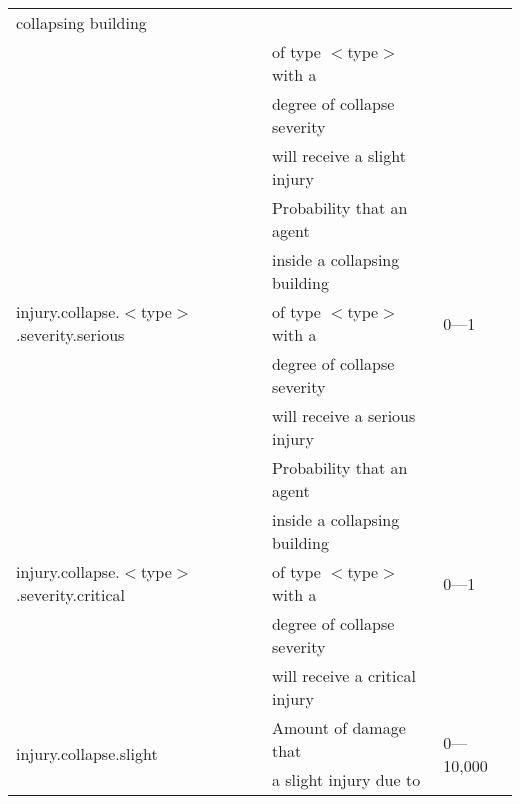 \documentclass{article}
\begin{document}
\begin{table}[htb]
\begin{tabular}{lll}
  collapsing building                   & \\
                                                                & of type
   $<$type$>$ with a                    & \\
                                                                & degree of
  collapse severity                     & \\
                                                                & will receive a
  slight injury                         & \\
  \hline
  \multirow{5}{*}{injury.collapse.$<$type$>$.severity.serious}  & Probability
  that an agent                         & \multirow{5}{*}{0---1}\\
                                                                & inside a
  collapsing building                   & \\
                                                                & of type
   $<$type$>$ with a                    & \\
                                                                & degree of
  collapse severity                     & \\
                                                                & will receive a
  serious injury                        & \\
  \hline
  \multirow{5}{*}{injury.collapse.$<$type$>$.severity.critical} & Probability
  that an agent                         & \multirow{5}{*}{0---1}\\
                                                                & inside a
  collapsing building                   & \\
                                                                & of type
  $<$type$>$ with a                     & \\
                                                                & degree of
  collapse severity                     & \\
                                                                & will receive a
  critical injury                       & \\
  \hline
  \multirow{3}{*}{injury.collapse.slight}                       & Amount of
  damage that                           & \multirow{3}{*}{0---10,000}\\
                                                                & a slight
  injury due to                         & \\

\end{tabular}
\end{table}
\end{document}
